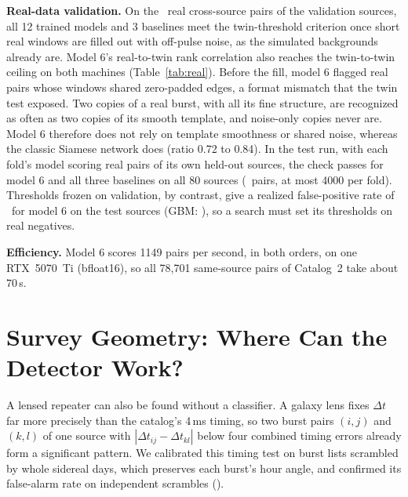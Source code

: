 \documentclass[conference]{IEEEtran}
\begin{document}
\textbf{Real-data validation.} On the \SthreeNpairs\ real cross-source pairs of the validation sources, all 12 trained
models and 3 baselines meet the twin-threshold criterion once short real windows are filled out with off-pulse noise, as the
simulated backgrounds already are. Model 6's real-to-twin rank correlation also reaches the twin-to-twin ceiling on both
machines (Table~\ref{tab:real}). Before the fill, model 6 flagged real pairs whose windows shared zero-padded edges, a
format mismatch that the twin test exposed. Two copies of a real burst, with all its fine
structure, are recognized as often as two copies of its smooth template, and noise-only copies never are. Model 6 therefore
does not rely on template smoothness or shared noise, whereas the classic Siamese network does (ratio 0.72 to 0.84). In the
test run, with each fold's model scoring real pairs of its own held-out sources, the check passes for model 6 and all three baselines on all 80 sources (\SfiveTransferPairs\ pairs, at most 4000 per fold). Thresholds frozen on validation, by contrast, give a realized false-positive rate of \TbFrozenFPRSix\ for
model 6 on the test sources (GBM: \TbFrozenFPRGBM), so a search must set its thresholds on real negatives.

\textbf{Efficiency.} Model 6 scores 1149 pairs per second, in both orders, on one RTX~5070~Ti (bfloat16), so all 78{,}701
same-source pairs of Catalog~2 take about 70\,s.

\section{Survey Geometry: Where Can the Detector Work?}
\label{sec:geometry}
A lensed repeater can also be found without a classifier. A galaxy lens fixes $\Delta t$ far more precisely than the
catalog's 4\,ms timing, so two burst pairs $(i,j)$ and $(k,l)$ of one source with $|\Delta t_{ij}-\Delta t_{kl}|$ below four combined
timing errors already form a significant pattern. We calibrated this timing test on burst lists
scrambled by whole sidereal days, which preserves each burst's hour angle, and confirmed its false-alarm rate on independent
scrambles (\FarHeldOut).
\end{document}
